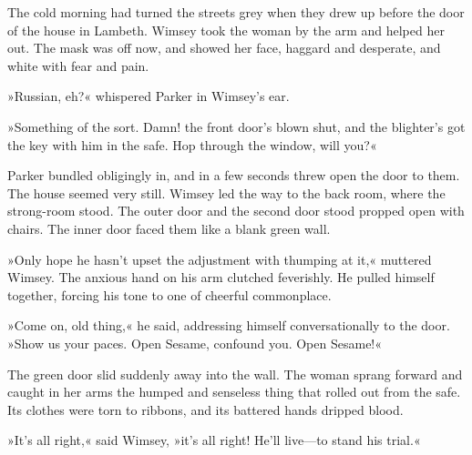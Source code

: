 The cold morning had turned the streets grey when they drew up before the door of the house in Lambeth. Wimsey took the woman by the arm and helped her out. The mask was off now, and showed her face, haggard and desperate, and white with fear and pain.

»Russian, eh?« whispered Parker in Wimsey's ear.

»Something of the sort. Damn! the front door's blown shut, and the blighter's got the key with him in the safe. Hop through the window, will you?«

Parker bundled obligingly in, and in a few seconds threw open the door to them. The house seemed very still. Wimsey led the way to the back room, where the strong-room stood. The outer door and the second door stood propped open with chairs. The inner door faced them like a blank green wall.

»Only hope he hasn't upset the adjustment with thumping at it,« muttered Wimsey. The anxious hand on his arm clutched feverishly. He pulled himself together, forcing his tone to one of cheerful commonplace.

»Come on, old thing,« he said, addressing himself conversationally to the door. »Show us your paces. Open Sesame, confound you. Open Sesame!«

The green door slid suddenly away into the wall. The woman sprang forward and caught in her arms the humped and senseless thing that rolled out from the safe. Its clothes were torn to ribbons, and its battered hands dripped blood.

»It's all right,« said Wimsey, »it's all right! He'll live—to stand his trial.«